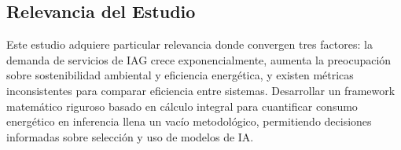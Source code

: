 \subsection{Relevancia del Estudio}

Este estudio adquiere particular relevancia donde convergen tres factores: la demanda de servicios de IAG crece exponencialmente, aumenta la preocupación sobre sostenibilidad ambiental y eficiencia energética, y existen métricas inconsistentes para comparar eficiencia entre sistemas. Desarrollar un framework matemático riguroso basado en cálculo integral para cuantificar consumo energético en inferencia llena un vacío metodológico, permitiendo decisiones informadas sobre selección y uso de modelos de IA.